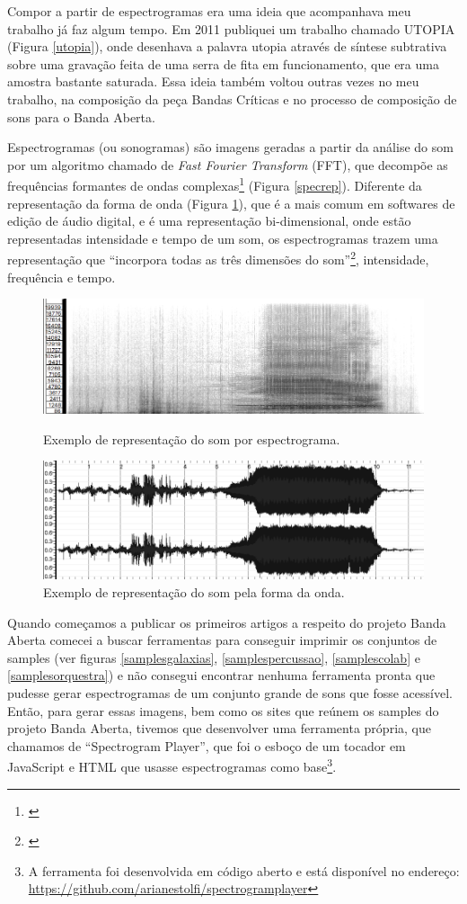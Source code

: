 Compor a partir de espectrogramas era uma ideia que acompanhava meu trabalho já faz algum tempo. Em 2011 publiquei um trabalho chamado UTOPIA (Figura \ref{utopia}), onde desenhava a palavra utopia através de síntese subtrativa sobre uma gravação feita de uma serra de fita em funcionamento, que era uma amostra bastante saturada. Essa ideia também voltou outras vezes no meu trabalho, na composição da peça Bandas Críticas e no processo de composição de sons para o Banda Aberta. 

Espectrogramas (ou sonogramas) são imagens geradas a partir da análise do som por um algoritmo chamado de \emph{Fast Fourier Transform} (FFT), que decompõe as frequências formantes de ondas complexas\footnote{\cite[p. 55]{Roads}} (Figura \ref{specrep}). Diferente da representação da forma de onda (Figura \ref{wave}), que é a mais comum em softwares de edição de áudio digital, e é uma representação bi-dimensional, onde estão representadas intensidade e tempo de um som, os espectrogramas trazem uma representação que ``incorpora todas as três dimensões do som''\footnote{\cite{Schafer2011}}, intensidade, frequência e tempo. 


\begin{figure}
\includegraphics[width=1\textwidth]{pictures/cap4/exemplospec}
\caption{\label{exemplospec}Exemplo de representação do som por espectrograma. }
\label{specrep}
\includegraphics[width=1\textwidth]{pictures/cap4/exemplowave}
\caption{\label{exemplowave}Exemplo de representação do som pela forma da onda. }
\label{wave}
\end{figure}

Quando começamos a publicar os primeiros artigos a respeito do projeto Banda Aberta comecei a buscar ferramentas para conseguir imprimir os conjuntos de samples (ver figuras \ref{samplesgalaxias}, \ref{samplespercussao}, \ref{samplescolab} e \ref{samplesorquestra}) e não consegui encontrar nenhuma ferramenta pronta que pudesse gerar espectrogramas de um conjunto grande de sons que fosse acessível. Então, para gerar essas imagens, bem como os sites que reúnem os samples do projeto Banda Aberta, tivemos que desenvolver uma ferramenta própria, que chamamos de ``Spectrogram Player'', que foi o esboço de um tocador em JavaScript e HTML que usasse espectrogramas como base\footnote{A ferramenta foi desenvolvida em código aberto e está disponível no endereço: \url{https://github.com/arianestolfi/spectrogramplayer}}. 

